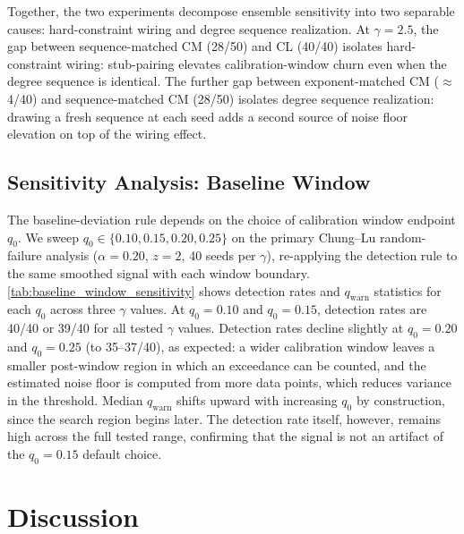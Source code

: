 \documentclass{nws}
\begin{document}
Together, the two experiments decompose ensemble sensitivity into two separable
causes: hard-constraint wiring and degree sequence realization.
At $\gamma=2.5$, the gap between sequence-matched CM (28/50) and CL (40/40) isolates hard-constraint wiring: stub-pairing
elevates calibration-window churn even when the degree sequence is identical.
The further gap between exponent-matched CM ($\approx$4/40) and sequence-matched CM (28/50)
isolates degree sequence realization: drawing a fresh sequence at each seed adds a second source of noise floor
elevation on top of the wiring effect.



\subsection{Sensitivity Analysis: Baseline Window}
\label{sec:baseline_window_sensitivity}
The baseline-deviation rule depends on the choice of calibration window endpoint $q_0$.
We sweep $q_0 \in \{0.10, 0.15, 0.20, 0.25\}$ on the primary Chung--Lu random-failure
analysis ($\alpha=0.20$, $z=2$, 40 seeds per $\gamma$), re-applying the detection rule to
the same smoothed signal with each window boundary.
\autoref{tab:baseline_window_sensitivity} shows detection rates and $q_{\mathrm{warn}}$
statistics for each $q_0$ across three $\gamma$ values.
At $q_0=0.10$ and $q_0=0.15$, detection rates are 40/40 or 39/40 for all tested $\gamma$
values. Detection rates decline slightly at $q_0=0.20$ and $q_0=0.25$ (to 35--37/40),
as expected: a wider calibration window leaves a smaller post-window region in which an
exceedance can be counted, and the estimated noise floor is computed from more data
points, which reduces variance in the threshold.
Median $q_{\mathrm{warn}}$ shifts upward with increasing $q_0$ by construction, since
the search region begins later. The detection rate itself, however, remains high across
the full tested range, confirming that the signal is not an artifact of the $q_0=0.15$
default choice.



\section{Discussion}
\label{sec:discussion}
\end{document}
